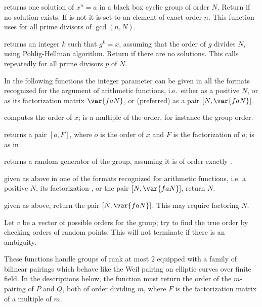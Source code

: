   returns one solution of $x^n = a$ in a
black box cyclic group of order $N$. Return  if no solution exists.
If  is not  it is set to an element of exact order $n$.
This function uses  for all prime divisors of $\gcd(n,N)$.

returns an integer $k$ such that $g^k = x$, assuming that the order of $g$
divides $N$, using Pohlig-Hellman algorithm. Return  if
there are no solutions. This calls  repeatedly for all prime
divisors $p$ of $N$.

In the following functions the integer parameter  can be given
in all the formats recognized for the argument of arithmetic functions,
i.e.~either as a positive  $N$, or as its factorization matrix
$\var{faN}$, or (preferred) as a pair $[N,\var{faN}]$.

computes the order of $x$;  is a multiple of the order, for instance
the group order.

 returns a pair $[o,F]$, where $o$ is the order of $x$ and $F$ is the
factorization of $o$;  is as in .

returns a random generator of the group, assuming it is of order exactly
.

 given  as above in one of the
formats recognized for arithmetic functions, i.e. a positive
 $N$, its factorization , or the pair $[N, \var{faN}]$,
return $N$.

 given  as above,
return the pair $[N, \var{faN}]$. This may require factoring $N$.

Let $v$ be a vector of possible orders for the group; try to find the true
order by checking orders of random points. This will not terminate if there
is an ambiguity.


These functions handle groups of rank at most $2$ equipped with a family of
bilinear pairings which behave like the Weil pairing on elliptic curves over
finite field. In the descriptions below, the function  must return the order of the $m$-pairing of $P$ and $Q$, both of order
dividing $m$, where $F$ is the factorization matrix of a multiple of $m$.

